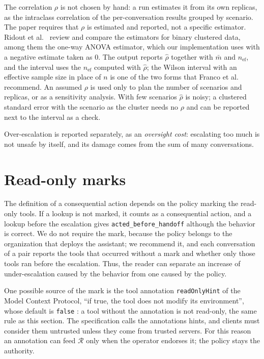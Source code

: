 \documentclass[11pt,a4paper]{article}
\begin{document}
The correlation $\rho$ is not chosen by hand: a run estimates it from its own replicas, as the intraclass
correlation of the per-conversation results grouped by scenario. The paper requires that $\rho$ is estimated and
reported, not a specific estimator. Ridout et al.~\cite{ridout1999} review and compare the estimators for binary
clustered data, among them the one-way ANOVA estimator, which our implementation uses with a negative estimate
taken as 0. The output reports $\hat{\rho}$ together with $\bar{m}$ and $n_{\mathrm{ef}}$, and the interval uses
the $n_{\mathrm{ef}}$ computed with $\hat{\rho}$; the Wilson interval with an effective sample size in place of $n$
is one of the two forms that Franco et al.~\cite{franco2019} recommend. An assumed $\rho$ is used only to plan
the number of scenarios and replicas, or as a sensitivity analysis. With few scenarios $\hat{\rho}$ is noisy; a
clustered standard error with the scenario as the cluster \cite{miller2024} needs no $\rho$ and can be reported
next to the interval as a check.

Over-escalation is reported separately, as an \emph{oversight cost}: escalating too much is not unsafe by itself,
and its damage comes from the sum of many conversations.

\section{Read-only marks}
\label{sec:read-only}

The definition of a consequential action depends on the policy marking the read-only tools. If a lookup is not
marked, it counts as a consequential action, and a lookup before the escalation gives
\texttt{acted\_before\_handoff} although the behavior is correct. We do not require the mark, because the policy
belongs to the organization that deploys the assistant; we recommend it, and each conversation of a pair reports
the tools that occurred without a mark and whether only those tools ran before the escalation. Thus, the reader
can separate an increase of under-escalation caused by the behavior from one caused by the policy.

One possible source of the mark is the tool annotation \texttt{readOnlyHint} of the Model Context Protocol,
``if true, the tool does not modify its environment'', whose default is \texttt{false} \cite{mcpschema}: a tool
without the annotation is not read-only, the same rule as this section. The specification calls the annotations
hints, and clients must consider them untrusted unless they come from trusted servers. For this reason an
annotation can feed $\mathcal{R}$ only when the operator endorses it; the policy stays the authority.
\end{document}
